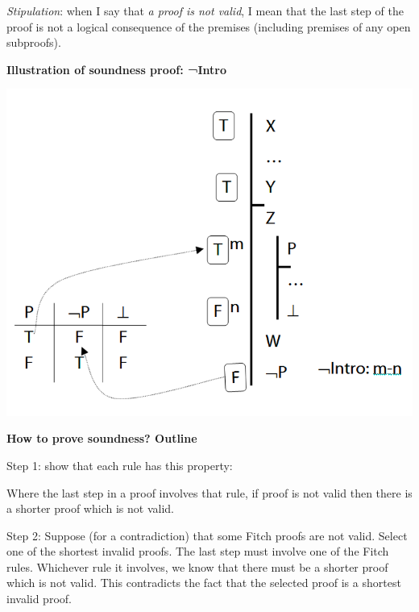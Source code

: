 \documentclass[12pt]{extarticle}
\begin{document}
\begin{multicols*}{3}
\emph{Stipulation}: when I say that \emph{a proof is not valid}, I mean that the last step of the proof is not a logical consequence of the premises (including premises of any open subproofs).
 
\begin{minipage}{\columnwidth}
 
\textbf{Illustration of soundness proof: ¬Intro}
 
\begin{center}
\includegraphics[scale=0.3]{img/soundness_not.png}
\end{center}
\end{minipage}
 
\begin{minipage}{\columnwidth}
 
\textbf{How to prove soundness? Outline}
 
Step 1: show that each rule has this property:
 
\hspace{5mm} Where the last step in a proof involves that rule, if proof is not valid then there is a shorter proof which is not valid.
 
Step 2: Suppose (for a contradiction) that some Fitch proofs are not valid. Select one of the shortest invalid proofs. The last step must involve one of the Fitch rules. Whichever rule it involves, we know that there must be a shorter proof which is not valid. This contradicts the fact that the selected proof is a shortest invalid proof.
 
\end{minipage}
 

\end{multicols*}
\end{document}
